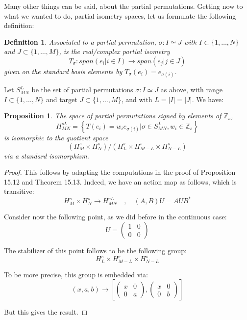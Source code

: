 \documentclass[12pt]{amsbook}
\newtheorem{definition}[theorem]{Definition}
\newtheorem{proposition}[theorem]{Proposition}
\begin{document}
Many other things can be said, about the partial permutations. Getting now to what we wanted to do, partial isometry spaces, let us formulate the following definition:


\begin{definition}
Associated to a partial permutation, $\sigma:I\simeq J$ with $I\subset\{1,\ldots,N\}$ and $J\subset\{1,\ldots,M\}$, is the real/complex partial isometry
$$T_\sigma:span\left(e_i\Big|i\in I\right)\to span\left(e_j\Big|j\in J\right)$$
given on the standard basis elements by $T_\sigma(e_i)=e_{\sigma(i)}$.
\end{definition}

Let $S_{MN}^L$ be the set of partial permutations $\sigma:I\simeq J$ as above, with range $I\subset\{1,\ldots,N\}$ and target $J\subset\{1,\ldots,M\}$, and with $L=|I|=|J|$. We have:

\begin{proposition}
The space of partial permutations signed by elements of $\mathbb Z_s$,
$$H_{MN}^{sL}=\left\{T(e_i)=w_ie_{\sigma(i)}\Big|\sigma\in S_{MN}^L,w_i\in\mathbb Z_s\right\}$$
is isomorphic to the quotient space 
$$(H_M^s\times H_N^s)/(H_L^s\times H_{M-L}^s\times H_{N-L}^s)$$
via a standard isomorphism.
\end{proposition}

\begin{proof}
This follows by adapting the computations in the proof of Proposition 15.12 and Theorem 15.13. Indeed, we have an action map as follows, which is transitive:
$$H_M^s\times H_N^s\to H_{MN}^{sL}\quad,\quad 
(A,B)U=AUB^*$$

Consider now the following point, as we did before in the continuous case:
$$U=\begin{pmatrix}1&0\\0&0\end{pmatrix}$$

The stabilizer of this point follows to be the following group:
$$H_L^s\times H_{M-L}^s\times H_{N-L}^s$$

To be more precise, this group is embedded via:
$$(x,a,b)\to\left[\begin{pmatrix}x&0\\0&a\end{pmatrix},\begin{pmatrix}x&0\\0&b\end{pmatrix}\right]$$

But this gives the result.
\end{proof}
\end{document}
